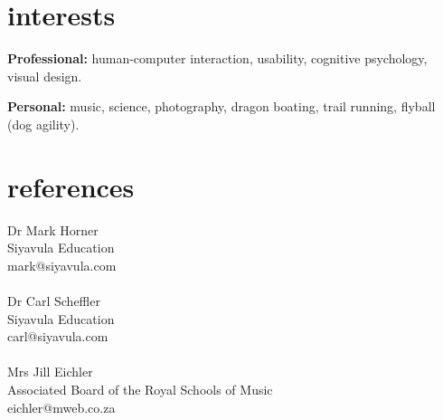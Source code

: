 \documentclass[]{friggeri-cv} %
\begin{document}

\section{interests}

\textbf{Professional:} human-computer interaction, usability, cognitive psychology, visual design.

\textbf{Personal:} music, science, photography, dragon boating, trail running, flyball (dog agility).


\section{references}

Dr Mark Horner\\
Siyavula Education\\
mark@siyavula.com\\
\\
Dr Carl Scheffler\\
Siyavula Education\\
carl@siyavula.com\\
\\
Mrs Jill Eichler\\
Associated Board of the Royal Schools of Music\\
eichler@mweb.co.za\\
\end{document}
